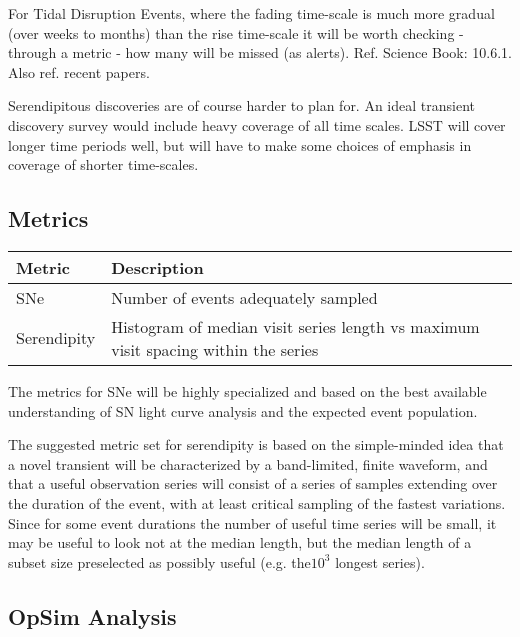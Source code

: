 For Tidal Disruption Events, where the fading time-scale is much more gradual (over weeks to months) than the rise time-scale it will be worth checking - through a metric - how many will be missed (as alerts). Ref. Science Book: 10.6.1. Also ref. recent papers.

Serendipitous discoveries are of course harder to plan for.  An ideal transient discovery survey would include heavy coverage of all time scales. LSST will cover longer time periods well, but will have to make some choices of emphasis in coverage of shorter time-scales.




\subsection{Metrics}
\label{sec:\secname:metrics}

\begin{center}
\begin{tabular}{| p{5cm} |p{10cm} |}
\hline Metric & Description\\
\hline
SNe & Number of events adequately sampled\\
Serendipity & Histogram of median visit series length vs maximum visit spacing within the series\\
  \hline \end{tabular}
 \end{center}

The metrics for SNe will be highly specialized and based on the best available understanding of SN light curve analysis and the expected event population.

The suggested metric set for serendipity is based on the simple-minded idea that a novel transient will be characterized by a band-limited, finite waveform, and that a useful observation series will consist of a series of samples extending over the duration of the event, with at least critical sampling of the fastest variations.  Since for some event durations the number of useful time series will be small, it may be useful to look not at the median length, but the median length of a subset size preselected as possibly useful (e.g. the$10^3$ longest series).


\subsection{OpSim Analysis}
\label{sec:\secname:analysis}

